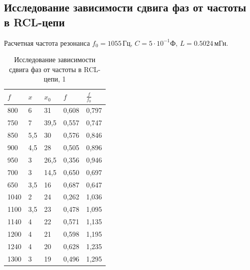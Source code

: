 \documentclass[a4paper,12pt]{article}
\begin{document}
	\subsection{Исследование зависимости сдвига фаз от частоты в RCL-цепи}
	Расчетная частота резонанса $f_0 = 1055\,\text{Гц},\,C = 5\cdot 10^{-1} \text{Ф},\,L = 0.5024\, \text{мГн}$.
	\begin{table}[h]
		\centering
		\caption{Исследование зависимости сдвига фаз от частоты в RCL-цепи, 1}
		\label{my-label}
		\begin{tabular}{|l|l|l|l|l|}
			\hline
			$f$    & $x$   & $x_0$ & $f$     & $\frac{f}{f_0}$ \\ \hline
			800  & 6   & 31   & 0,608 & 0,797  \\ \hline
			750  & 7   & 39,5 & 0,557 & 0,747  \\ \hline
			850  & 5,5 & 30   & 0,576 & 0,846  \\ \hline
			900  & 4,5 & 28   & 0,505 & 0,896  \\ \hline
			950  & 3   & 26,5 & 0,356 & 0,946  \\ \hline
			700  & 3   & 14,5 & 0,650 & 0,697  \\ \hline
			650  & 3,5 & 16   & 0,687 & 0,647  \\ \hline
			1040 & 2   & 24   & 0,262 & 1,036  \\ \hline
			1100 & 3,5 & 23   & 0,478 & 1,095  \\ \hline
			1140 & 4   & 22   & 0,571 & 1,135  \\ \hline
			1200 & 4   & 21   & 0,598 & 1,195  \\ \hline
			1240 & 4   & 20   & 0,628 & 1,235  \\ \hline
			1300 & 3   & 19   & 0,496 & 1,295  \\ \hline
		\end{tabular}
	\end{table}
	
\end{document}
